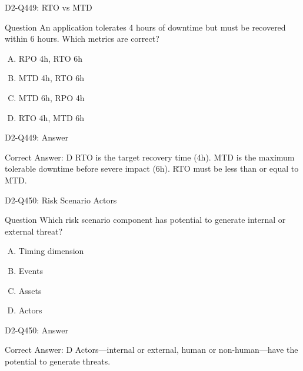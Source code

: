 \documentclass{beamer}
\begin{document}
\begin{frame}{D2-Q449: RTO vs MTD}
	\begin{block}{Question}
		An application tolerates 4 hours of downtime but must be recovered within 6 hours. Which metrics are correct?
	\end{block}
	\begin{enumerate}[(A)]
		\item RPO 4h, RTO 6h
		\item MTD 4h, RTO 6h
		\item MTD 6h, RPO 4h
		\item RTO 4h, MTD 6h
	\end{enumerate}
\end{frame}
\begin{frame}{D2-Q449: Answer}
	\begin{block}{Correct Answer: D}
		RTO is the target recovery time (4h). MTD is the maximum tolerable downtime before severe impact (6h). RTO must be less than or equal to MTD.
	\end{block}
\end{frame}

\begin{frame}{D2-Q450: Risk Scenario Actors}
	\begin{block}{Question}
		Which risk scenario component has potential to generate internal or external threat?
	\end{block}
	\begin{enumerate}[(A)]
		\item Timing dimension
		\item Events
		\item Assets
		\item Actors
	\end{enumerate}
\end{frame}
\begin{frame}{D2-Q450: Answer}
	\begin{block}{Correct Answer: D}
		Actors—internal or external, human or non-human—have the potential to generate threats.
	\end{block}
\end{frame}
\end{document}
